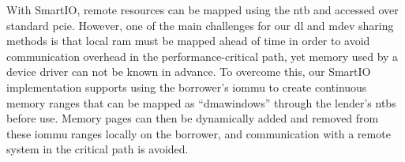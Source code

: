 \objperformance*%
%
With SmartIO, remote resources can be mapped using the \gls{ntb} and accessed over standard \gls{pcie}.
%
However, one of the main challenges for our \gls{dl} and \gls{mdev} sharing methods is that local \gls{ram} must be mapped ahead of time in order to avoid communication overhead in the performance-critical path, yet memory used by a device driver can not be known in advance.
%
To overcome this, our SmartIO implementation supports using the \gls{borrower}'s \gls{iommu} to create continuous memory ranges that can be mapped as ``\glspl{dmawindow}'' through the \gls{lender}'s \glspl{ntb} before use.
%
Memory pages can then be dynamically added and removed from these \gls{iommu} ranges locally on the \gls{borrower}, and communication with a remote system in the critical path is avoided.
%



